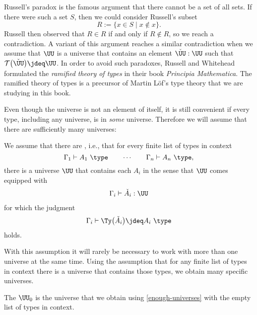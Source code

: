   Russell's paradox is the famous argument that there cannot be a set of all sets. If there were such a set $S$, then we could consider Russell's subset
  \begin{equation*}
    R:=\{x\in S\mid x\notin x\}.
  \end{equation*}
  Russell then observed that $R\in R$ if and only if $R\notin R$, so we reach a contradiction. A variant of this argument reaches a similar contradiction when we assume that $\UU$ is a universe that contains an element $\check{\UU}:\UU$ such that $\mathcal{T}\big(\check{\UU}\big)\jdeq \UU$. In order to avoid such paradoxes, Russell and Whitehead formulated the \emph{ramified theory of types} in their book \emph{Principia Mathematica}. The ramified theory of types is a precursor of Martin L\"of's type theory that we are studying in this book.  

  Even though the universe is not an element of itself, it is still convenient if every type, including any universe, is in \emph{some} universe. Therefore we will assume that there are sufficiently many universes:
  
  \begin{postulate}\label{enough-universes}
    We assume that there are , i.e., that for every finite list of types in context
    \begin{equation*}
      \Gamma_1\vdash A_1~\type\qquad\cdots\qquad\Gamma_n\vdash A_n~\type,
    \end{equation*}
    there is a universe $\UU$ that contains each $A_i$ in the sense that $\UU$ comes equipped with
    \begin{align*}
      \Gamma_i\vdash \check{A}_i:\UU
    \end{align*}
    for which the judgment
    \begin{equation*}
      \Gamma_i\vdash \Ty\big(\check{A}_i\big)\jdeq A_i~\type
    \end{equation*}
    holds.
  \end{postulate}

With this assumption it will rarely be necessary to work with more than one universe at the same time. Using the assumption that for any finite list of types in context there is a universe that contains those types, we obtain many specific universes.

\begin{defn}
  The  $\UU_0$ is the universe that we obtain using \cref{enough-universes} with the empty list of types in context.
\end{defn}

